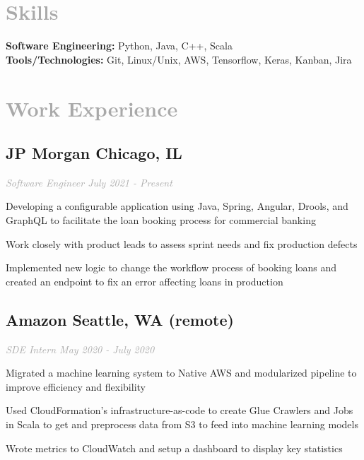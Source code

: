 \documentclass{article}
\begin{document}
{\section[Skills \hfill]{\textcolor{darkgray}{Skills \sout{\hfill}}}
	{
	{\bfseries Software Engineering: }Python, Java, C++, Scala\\
    	{\bfseries Tools/Technologies: }Git, Linux/Unix, AWS, Tensorflow, Keras, Kanban, Jira
  
\section[Work Experience \hfill]{\textcolor{darkgray}{Work Experience \sout{\hfill}}}
	\subsection{{\bfseries\large JP Morgan} \hfill Chicago, IL}
	\textit{\textcolor{darkgray}{Software Engineer \hfill \textit{July 2021 - Present}}}
	\begin{myitemize}
		\item Developing a configurable application using Java, Spring, Angular, Drools, and GraphQL to facilitate the loan booking process for commercial banking
		\item Work closely with product leads to assess sprint needs and fix production defects
		\item Implemented new logic to change the workflow process of booking loans and created an endpoint to fix an error affecting loans in production
	\end{myitemize}
	
	\subsection{{\bfseries\large Amazon} \hfill Seattle, WA (remote)}
	\textit{\textcolor{darkgray}{SDE Intern \hfill \textit{May 2020 - July 2020}}}
	\begin{myitemize}
		\item Migrated a machine learning system to Native AWS and modularized pipeline to improve efficiency and flexibility
		\item Used CloudFormation's infrastructure-as-code to create Glue Crawlers and Jobs in Scala to get and preprocess data from S3 to feed into machine learning models
		\item Wrote metrics to CloudWatch and setup a dashboard to display key statistics
	\end{myitemize}

}}
\end{document}
